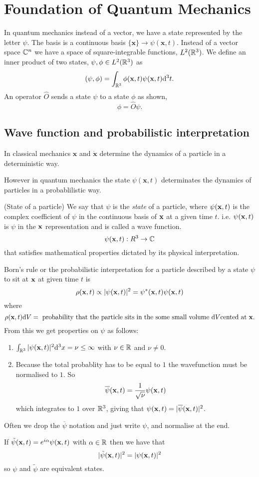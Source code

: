 \documentclass{article}
\begin{document}
\section{Foundation of Quantum Mechanics}
In quantum mechanics instead of a vector, we have a state represented by the letter $ \psi $. The basis is a continuous basis $ \{\mathbf x\}\to \psi(\mathbf x, t) $. Instead of a vector space $ \mathbb{C}^n $ we have a space of square-integrable functions, $ L^2(\mathbb{R}^3) $. We define an inner product of two states, $ \psi,\phi\in L^2(\mathbb{R}^3) $ as
\[
	(\psi,\phi)=\int_{\mathbb{R}^3}\phi(\mathbf x,t)\psi(\mathbf x,t)\mathrm d^3t.
\]
An operator $ \hat O $ sends a state $ \psi $ to a state $ \phi $ as shown,
\[
  \phi=\hat O\psi.
\]
\subsection{Wave function and probabilistic interpretation}
In classical mechanics $ \mathbf x $ and $ \dot{\mathbf x} $ determine the dynamics of a particle in a deterministic way.\par
However in quantum mechanics the state $ \psi(\mathbf x,t) $ determinates the dynamics of particles in a probablilistic way.
\begin{definition}
	(State of a particle) We say that $ \psi $ is the \textit{state} of a particle, where $ \psi(\mathbf{x},t) $ is the complex coefficient of $ \psi $ in the continuous basis of $ \mathbf{x} $ at a given time $ t $. i.e. $ \psi(\mathbf{x},t) $ is $ \psi $ in the $ \mathbf{x} $ representation and is called a wave function.
	\[
	  \psi(\mathbf{x},t):R^3\to \mathbb{C}
	\]
	that satisfies mathematical properties dictated by its physical interpretation.
\end{definition}
Born's rule or the probabilistic interpretation for a particle described by a state $ \psi $ to sit at $ \mathbf{x} $ at given time $ t $ is
\[
  \rho(\mathbf{x},t)\propto|\psi(\mathbf{x},t)|^2=\psi^*(\mathbf{x},t)\psi(\mathbf{x},t)
\]
where
\[
	\rho(\mathbf{x},t)\mathrm dV=\text{ probability that the particle sits in the some small volume } \mathrm dV \text {cented at } \mathbf{x}.
\]
From this we get properties on $ \psi $ as follows:
\begin{enumerate}
	\item $ \int_{\mathbb{R}^3}|\psi(\mathbf{x},t)|^2\mathrm d^3x=\nu\le\infty $ with $ \nu\in\mathbb{R} $ and $ \nu\ne 0 $.
	\item Because the total probablity has to be equal to $ 1 $ the wavefunction must be normalised to $ 1 $. So
		\[
			\overline\psi(\mathbf{x},t)=\frac{1}{\sqrt \nu}\psi(\mathbf{x},t)
		\]
		which integrates to $ 1 $ over $ \mathbb{R}^3 $, giving that $ \psi(\mathbf{x},t)=|\overline\psi(\mathbf{x},t)|^2 $.
\end{enumerate}
\begin{remark}
Often we drop the $ \overline\psi $ notation and just write $ \psi $, and normalise at the end.
\end{remark}
If $ \tilde{\psi}(\mathbf{x},t) =e^{i\alpha}\psi(\mathbf{x},t) $ with $ \alpha\in \mathbb{R} $ then we have that
\[
	|\tilde{\psi}(\mathbf{x},t)|^2=|\psi(\mathbf{x},t)|^2
\]
so $ \psi $ and $ \tilde\psi $ are equivalent states.
\end{document}
